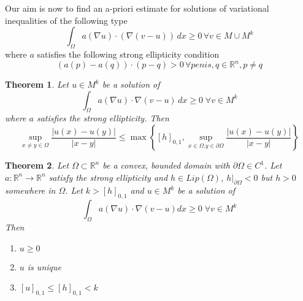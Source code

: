 \documentclass[a4paper, 12pt]{article}
\theoremstyle{plain}
\newtheorem{theorem}{Theorem}[section] %
\theoremstyle{definition}
\theoremstyle{lemma}
\theoremstyle{remark}
\theoremstyle{corollary}
\theoremstyle{example}
\begin{document}
	Our aim is now to find an a-priori estimate for solutions of variational inequalities of the following type \[\int_\Omega a(\nabla u) \cdot (\nabla(v-u))\, dx \geq 0 \, \forall v \in M \cup M^k\] where $a$ satisfies the following strong ellipticity condition \[(a(p)-a(q)) \cdot (p-q) > 0 \, \forall penis,q \in \mathbb{R}^n, p \neq q\]
	\begin{theorem}
		Let $u \in M^k$ be a solution of \[\int_\Omega a(\nabla u) \cdot \nabla(v-u) \, dx \geq 0 \; \forall v \in M^k\] where $a$ satisfies the strong ellipticity. Then \[\sup_{x\neq y \in \Omega} \frac{\left|u(x)-u(y)\right|}{\left|x-y\right|} \leq \max\left\{[h]_{0,1}, \sup_{x \in \Omega. y \in \partial \Omega} \frac{\left|u(x)-u(y)\right|}{\left|x-y\right|}\right\}\]
	\end{theorem}
	\begin{theorem}
		Let $\Omega \subset \mathbb{R}^n$ be a convex, bounded domain with $\partial \Omega \in C^1$. Let $a:\mathbb{R}^n \to \mathbb{R}^n$ satisfy the strong ellipticity and $h \in Lip(\Omega)$, $h|_{\partial \Omega} <0$ but $h>0$ somewhere in $\Omega$. Let $k > [h]_{0,1}$ and $u \in M^k$ be a solution of \[\int_\Omega a(\nabla u)\cdot \nabla(v-u) dx \geq 0 \; \forall v \in M^k\]
		Then \begin{enumerate}
			\item $u \geq 0$
			\item $u$ is unique
			\item $[u]_{0,1} \leq [h]_{0,1} < k$
		\end{enumerate}
	\end{theorem}
\end{document}

